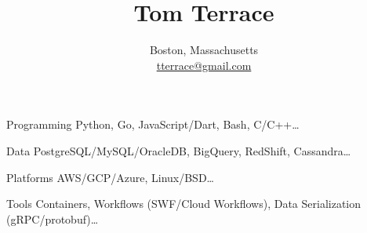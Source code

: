 \documentclass[10pt]{article}   	%
\title{\bfseries\Huge Tom Terrace\vspace{-0.3cm}}
\author{
	Boston, Massachusetts\\
	\href{mailto:tterrace@gmail.com}{tterrace@gmail.com}\vspace{-0.5cm}
}
\date{}							%
\begin{document}
\maketitle
\thispagestyle{empty}
\pagestyle{empty}

\begin{description*}
	\item[Programming] Python, Go, JavaScript/Dart, Bash, C/C++\ldots
	\item[Data] PostgreSQL/MySQL/OracleDB, BigQuery, RedShift, Cassandra\ldots
	\item[Platforms] AWS/GCP/Azure, Linux/BSD\ldots
	\item[Tools] Containers, Workflows (SWF/Cloud Workflows), Data Serialization (gRPC/protobuf)\ldots
\end{description*}
\end{document}
